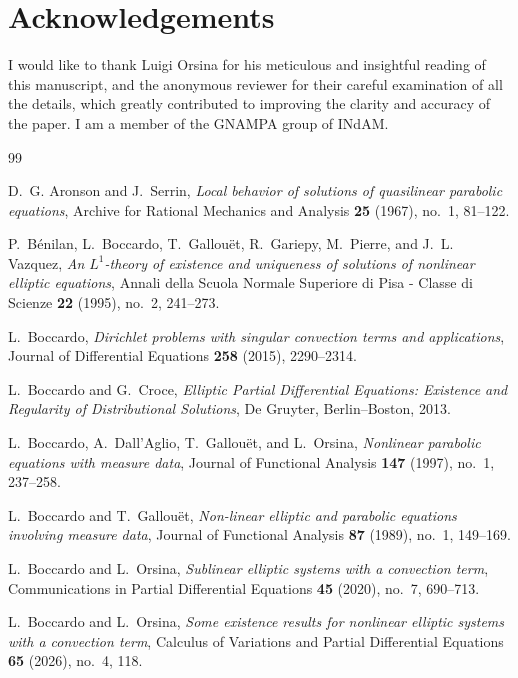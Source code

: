 \documentclass{amsart}
\numberwithin{equation}{section}
\begin{document}
\section*{Acknowledgements}

I would like to thank Luigi Orsina for his meticulous and insightful reading of this manuscript, and the anonymous reviewer for their careful examination of all the details, which greatly contributed to improving the clarity and accuracy of the paper. I am a member of the GNAMPA group of INdAM.

\newpage

\begin{thebibliography}{99}

D.~G. Aronson and J.~Serrin, \emph{Local behavior of solutions of quasilinear parabolic equations}, Archive for Rational Mechanics and Analysis \textbf{25} (1967), no.~1, 81--122.

P.~B\'enilan, L.~Boccardo, T.~Gallou\"et, R.~Gariepy, M.~Pierre, and J.~L. Vazquez, \emph{An $L^1$-theory of existence and uniqueness of solutions of nonlinear elliptic equations}, Annali della Scuola Normale Superiore di Pisa - Classe di Scienze \textbf{22} (1995), no.~2, 241--273.

L.~Boccardo, \emph{Dirichlet problems with singular convection terms and applications}, Journal of Differential Equations \textbf{258} (2015), 2290--2314.

L.~Boccardo and G.~Croce,
\emph{Elliptic Partial Differential Equations: Existence and Regularity of Distributional Solutions},
De Gruyter, Berlin--Boston, 2013.

L.~Boccardo, A.~Dall'Aglio, T.~Gallou\"et, and L.~Orsina, \emph{Nonlinear parabolic equations with measure data}, Journal of Functional Analysis \textbf{147} (1997), no.~1, 237--258.

L.~Boccardo and T.~Gallou\"et, \emph{Non-linear elliptic and parabolic equations involving measure data}, Journal of Functional Analysis \textbf{87} (1989), no.~1, 149--169.

L.~Boccardo and L.~Orsina, \emph{Sublinear elliptic systems with a convection term}, Communications in Partial Differential Equations \textbf{45} (2020), no.~7, 690--713.

L.~Boccardo and L.~Orsina, \emph{Some existence results for nonlinear elliptic systems with a convection term}, Calculus of Variations and Partial Differential Equations \textbf{65} (2026), no.~4, 118.


\end{thebibliography}
\end{document}
